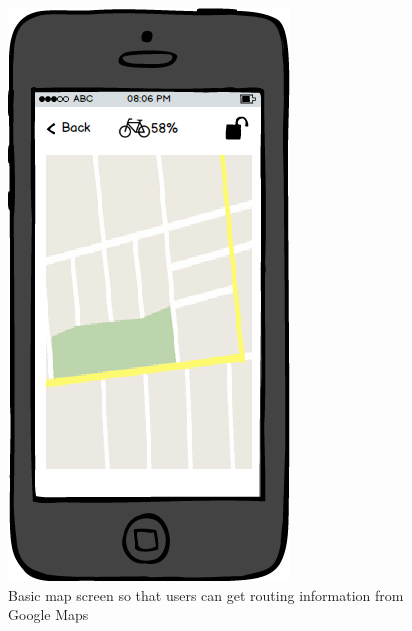 \documentclass[a4paper]{report}
\begin{document}
\clearpage
\begin{figure}
\centering
\includegraphics[scale=0.9]{figures/prototype_2/map}
\caption{Basic map screen so that users can get routing information from Google Maps}
\end{figure}
\clearpage
%
\end{document}
